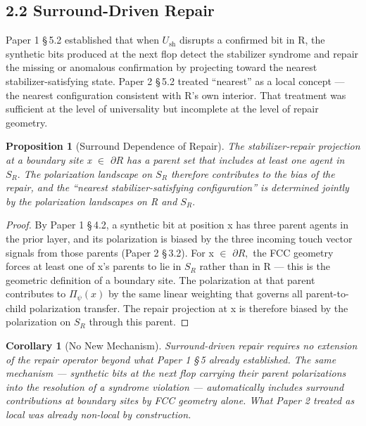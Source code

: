 \documentclass[11pt,oneside]{report}
\newtheorem{corollary}[theorem]{Corollary}
\newtheorem{proposition}[theorem]{Proposition}
\theoremstyle{definition}
\theoremstyle{remark}
\begin{document}
\subsection*{2.2 Surround-Driven Repair}

Paper 1 \S\,5.2 established that when \ensuremath{U_{\mathrm{sh}}} disrupts a confirmed bit in R,
the synthetic bits produced at the next flop detect the stabilizer
syndrome and repair the missing or anomalous confirmation by projecting
toward the nearest stabilizer-satisfying state. Paper 2 \S\,5.2 treated
``nearest'' as a local concept --- the nearest configuration consistent
with R's own interior. That treatment was sufficient at the level of
universality but incomplete at the level of repair geometry.

\begin{proposition}[Surround Dependence of Repair]
The stabilizer-repair
projection at a boundary site x \ensuremath{\in} \ensuremath{\partial R} has a parent set that includes at
least one agent in \ensuremath{S_{R}.} The polarization landscape on \ensuremath{S_{R}} therefore
contributes to the bias of the repair, and the ``nearest
stabilizer-satisfying configuration'' is determined jointly by the
polarization landscapes on R and \ensuremath{S_{R}.}
\end{proposition}

\begin{proof}
By Paper 1 \S\,4.2, a synthetic bit at position x has three parent
agents in the prior layer, and its polarization is biased by the three
incoming touch vector signals from those parents (Paper 2 \S\,3.2). For x \ensuremath{\in}
\ensuremath{\partial R,} the FCC geometry forces at least one of x's parents to lie in \ensuremath{S_{R}}
rather than in R --- this is the geometric definition of a boundary
site. The polarization at that parent contributes to \ensuremath{\Pi_{\psi}(x)} by the same
linear weighting that governs all parent-to-child polarization transfer.
The repair projection at x is therefore biased by the polarization on
\ensuremath{S_{R}} through this parent.

\end{proof}

\begin{corollary}[No New Mechanism]
Surround-driven repair requires no
extension of the repair operator beyond what Paper 1 \S\,5 already
established. The same mechanism --- synthetic bits at the next flop
carrying their parent polarizations into the resolution of a syndrome
violation --- automatically includes surround contributions at boundary
sites by FCC geometry alone. What Paper 2 treated as local was already
non-local by construction.
\end{corollary}
\end{document}
